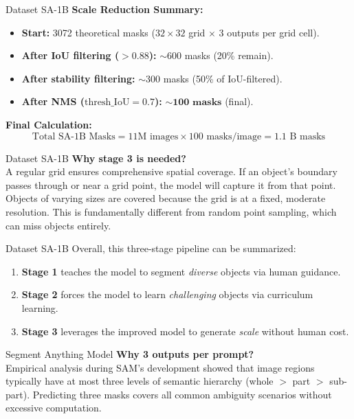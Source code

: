 \documentclass[11pt, aspectratio=169]{beamer}
\begin{document}
\begin{frame}{Dataset SA-1B}
	\textbf{Scale Reduction Summary:}
	\begin{itemize}
		\item \textbf{Start:} 3072 theoretical masks ($32 \times 32$ grid $\times$ 3 outputs per grid cell).
		\item \textbf{After IoU filtering ($>0.88$):} $\sim$600 masks (20\% remain).
		\item \textbf{After stability filtering:} $\sim$300 masks (50\% of IoU-filtered).
		\item \textbf{After NMS ($\text{thresh\_IoU} = 0.7$):} $\mathbf{\sim100 \text{ masks}}$ (final).
	\end{itemize}
	
	\textbf{Final Calculation:}
	\[
	\text{Total SA-1B Masks} = 11\text{M images} \times 100 \text{ masks/image} = 1.1 \text{ B masks}
	\]
\end{frame}

\begin{frame}{Dataset SA-1B}
	\textbf{Why stage 3 is needed?}\\
	A regular grid ensures comprehensive spatial coverage. If an object's boundary passes through or near a grid point, the model will capture it from that point. Objects of varying sizes are covered because the grid is at a fixed, moderate resolution. This is fundamentally different from random point sampling, which can miss objects entirely.
\end{frame}

\begin{frame}{Dataset SA-1B}
	Overall, this three-stage pipeline can be summarized:
	\begin{enumerate}
		\item \textbf{Stage 1} teaches the model to segment \textit{diverse} objects via human guidance.
		\item \textbf{Stage 2} forces the model to learn \textit{challenging} objects via curriculum learning.
		\item \textbf{Stage 3} leverages the improved model to generate \textit{scale} without human cost.
	\end{enumerate}
\end{frame}

\begin{frame}{Segment Anything Model}
	\textbf{Why 3 outputs per prompt?}\\
	Empirical analysis during SAM's development showed that image regions typically have at most three levels of semantic hierarchy (whole $>$ part $>$ sub-part). Predicting three masks covers all common ambiguity scenarios without excessive computation.
\end{frame}
\end{document}
